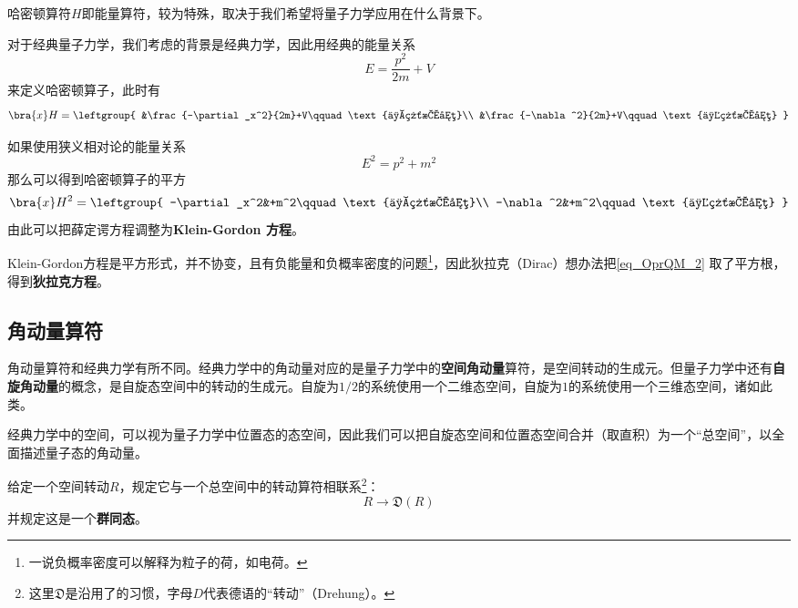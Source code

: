 哈密顿算符$H$即能量算符，较为特殊，取决于我们希望将量子力学应用在什么背景下。

对于经典量子力学，我们考虑的背景是经典力学，因此用经典的能量关系
\begin{equation}
E=\frac{p^2}{2m}+V
\end{equation}
来定义哈密顿算子，此时有
\begin{equation}
\bra{x}H = \leftgroup{
    &\frac{-\partial_x^2}{2m}+V\qquad\text{一维情况}\\
    &\frac{-\nabla^2}{2m}+V\qquad\text{三维情况}
}
\end{equation}

如果使用狭义相对论的能量关系
\begin{equation}
E^2 = p^2+m^2
\end{equation}
那么可以得到哈密顿算子的平方
\begin{equation}\label{eq_OprQM_2}
\bra{x}H^2 = \leftgroup{
    -\partial_x^2&+m^2\qquad\text{一维情况}\\
    -\nabla^2&+m^2\qquad\text{三维情况}
}
\end{equation}
由此可以把薛定谔方程调整为\textbf{Klein-Gordon 方程}。

Klein-Gordon方程是平方形式，并不协变，且有负能量和负概率密度的问题\footnote{一说负概率密度可以解释为粒子的荷，如电荷。}，因此狄拉克（Dirac）想办法把\autoref{eq_OprQM_2} 取了平方根，得到\textbf{狄拉克方程}。



\subsection{角动量算符}\label{sub_OprQM_1}

角动量算符和经典力学有所不同。经典力学中的角动量对应的是量子力学中的\textbf{空间角动量}算符，是空间转动的生成元。但量子力学中还有\textbf{自旋角动量}的概念，是自旋态空间中的转动的生成元。自旋为$1/2$的系统使用一个二维态空间，自旋为$1$的系统使用一个三维态空间，诸如此类。

经典力学中的空间，可以视为量子力学中位置态的态空间，因此我们可以把自旋态空间和位置态空间合并（取直积）为一个“总空间”，以全面描述量子态的角动量。

给定一个空间转动$R$，规定它与一个总空间中的转动算符相联系\footnote{这里$\mathfrak{D}$是沿用了\cite{Sakurai}的习惯，字母$D$代表德语的“转动”（Drehung）。}：
\begin{equation}
R\to \mathfrak{D}(R)
\end{equation}
并规定这是一个\textbf{群同态}。


